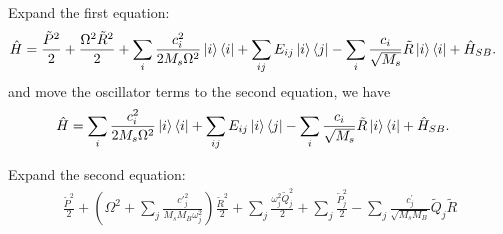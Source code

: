 \documentclass{article}
\begin{document}
Expand the first equation:
\begin{align*}
	\hat{H} &= 
	\frac{\tilde{P}^{2}}{2}
	+ \frac{\Omega^{2}\tilde{R}^2}{2}
	+ \sum_i \frac{c_{i}^2}{2M_{s} \Omega^{2}} \ket{i}\bra{i}
	+ \sum_{ij}E_{ij}\ket{i}\bra{j}
	- \sum_{i}\frac{c_{i}}{\sqrt{M_s}} \tilde{R}\ket{i}\bra{i}
	+\hat{H}_{S B}.
\end{align*}
and move the oscillator terms to the second equation, we have
\begin{align}
	\hat{H} &= 
	\sum_i \frac{c_{i}^2}{2M_{s} \Omega^{2}} \ket{i}\bra{i}
	+ \sum_{ij}E_{ij}\ket{i}\bra{j}
	- \sum_{i}\frac{c_{i}}{\sqrt{M_s}} \tilde{R}\ket{i}\bra{i}
	+\hat{H}_{S B}.
	\label{eq:sys+coupling}
\end{align}

Expand the second equation:
\begin{align*}
	\frac{\tilde{P}^{2}}{2}
	+ \left( \Omega^{2}+\sum_j \frac{ c'^ 2_{j}}{M_sM_B \omega_{j}^{2}}\right)\frac{\tilde{R}^2}{2}
	+ \sum_j \frac{\omega_{j}^{2}\tilde{Q}_j^2}{2}
	+ \sum_j\frac{\tilde{P}_j^2}{2}
	- \sum_j  \frac{c^{\prime}_{j}}{\sqrt{M_sM_B}} \tilde{Q}_{j}\tilde{R}
\end{align*}
\end{document}
